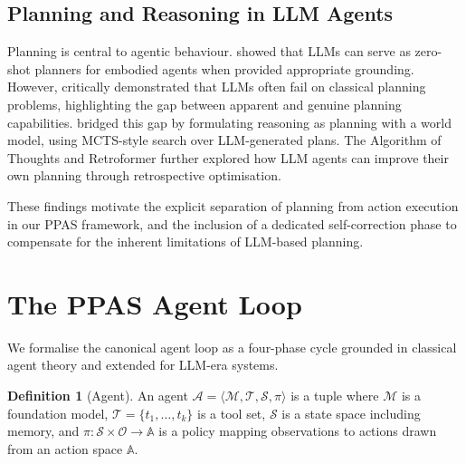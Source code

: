 \documentclass[review]{elsarticle}
\theoremstyle{definition}
\newtheorem{definition}{Definition}
\begin{document}
\subsection{Planning and Reasoning in LLM Agents}

Planning is central to agentic behaviour. \citet{huang2024understanding} showed that LLMs can serve as zero-shot planners for embodied agents when provided appropriate grounding. However, \citet{valmeekam2024planning} critically demonstrated that LLMs often fail on classical planning problems, highlighting the gap between apparent and genuine planning capabilities. \citet{hao2023reasoning} bridged this gap by formulating reasoning as planning with a world model, using MCTS-style search over LLM-generated plans. The Algorithm of Thoughts \citep{sel2023algorithm} and Retroformer \citep{yao2023retroformer} further explored how LLM agents can improve their own planning through retrospective optimisation.

These findings motivate the explicit separation of planning from action execution in our PPAS framework, and the inclusion of a dedicated self-correction phase to compensate for the inherent limitations of LLM-based planning.

\section{The PPAS Agent Loop}\label{sec:ppas}

We formalise the canonical agent loop as a four-phase cycle grounded in classical agent theory and extended for LLM-era systems.

\begin{definition}[Agent]
An agent $\mathcal{A} = \langle \mathcal{M}, \mathcal{T}, \mathcal{S}, \pi \rangle$ is a tuple where $\mathcal{M}$ is a foundation model, $\mathcal{T} = \{t_1, \ldots, t_k\}$ is a tool set, $\mathcal{S}$ is a state space including memory, and $\pi: \mathcal{S} \times \mathcal{O} \rightarrow \mathbb{A}$ is a policy mapping observations to actions drawn from an action space $\mathbb{A}$.
\end{definition}
\end{document}

